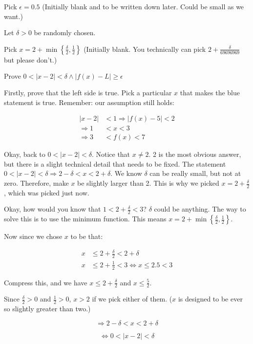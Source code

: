\documentclass[12pt]{article}
\theoremstyle{plain}
\theoremstyle{remark}
\theoremstyle{definition}
\begin{document}
Pick \(\epsilon = 0.5\) (Initially blank and to be written down later.
Could be small as we want.)

Let \(\delta > 0\) be randomly chosen.

Pick \(x = 2 + \min\left\{ \frac{\delta}{2},\frac{1}{2} \right\}\)
(Initially blank. You technically can pick
\(2 + \frac{\delta}{69696969}\) but please don't.)

Prove
\(0 < |x - 2| < \delta \land \left| f(x) - L \right| \geq \epsilon\)

Firstly, prove that the left side is true. Pick a particular \(x\) that
makes the blue statement is true. Remember: our assumption still holds:

\begin{align*}
|x - 2| &< 1 \Rightarrow \left| f(x) - 5 \right| < 2 \\
\Rightarrow 1 &< x < 3 \\
\Rightarrow 3 &< f(x) < 7
\end{align*}


Okay, back to \(0 < |x - 2| < \delta\). Notice that \(x \neq 2\). 2 is
the most obvious answer, but there is a slight technical detail that
needs to be fixed. The statement
\(0 < |x - 2| < \delta \Rightarrow 2 - \delta < x < 2 + \delta\). We
know \(\delta\) can be really small, but not at zero. Therefore, make
\(x\) be slightly larger than 2. This is why we picked
\(x = 2 + \frac{\delta}{2}\), which was picked just now.

Okay, how would you know that \(1 < 2 + \frac{\delta}{2} < 3\)?
\(\delta\) could be anything. The way to solve this is to use the
minimum function. This means
\(x = 2 + \min\left\{ \frac{\delta}{2},\frac{1}{2} \right\}\).

Now since we chose \(x\) to be that:

\begin{align*}
x &\leq 2 + \frac{\delta}{2} < 2 + \delta \\
x &\leq 2 + \frac{1}{2} < 3 \Leftrightarrow x \leq 2.5 < 3
\end{align*}


Compress this, and we have \(x \leq 2 + \frac{\delta}{2}\) and
\(x \leq \frac{5}{2}\).

Since \(\frac{\delta}{2} > 0\) and \(\frac{1}{2} > 0\), \(x > 2\) if we
pick either of them. (\(x\) is designed to be ever so slightly greater
than two.)

\[\Rightarrow 2 - \delta < x < 2 + \delta\]

\[\Leftrightarrow 0 < |x - 2| < \delta\]
\end{document}

